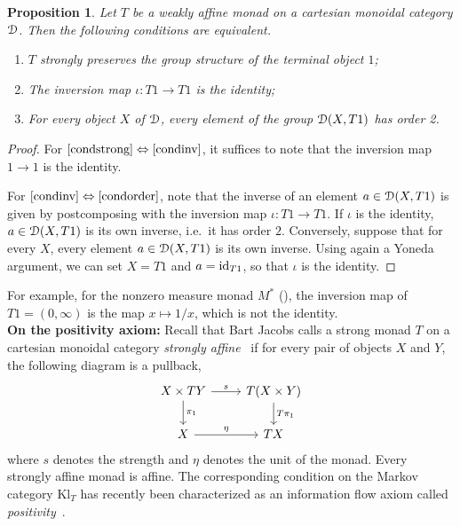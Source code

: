 \documentclass[a4paper,UKenglish,numberwithinsect,cleveref, autoref, thm-restate]{lipics-v2021}
\theoremstyle{plain} %
\newtheorem{myproposition}[mytheorem]{Proposition}
\theoremstyle{definition} %
\begin{document}
\begin{myproposition}
 Let $T$ be a weakly affine monad on a cartesian monoidal category $\mathcal{D}$. Then the following conditions are equivalent.
 \begin{enumerate}
  \item\label{condstrong} $T$ strongly preserves the group structure of the terminal object $1$;
  \item\label{condinv} The inversion map $\iota:T1\to T1$ is the identity;
  \item\label{condorder} For every object $X$ of $\mathcal{D}$, every element of the group $\mathcal{D}(X,T1)$ has order 2. 
 \end{enumerate}
\end{myproposition}
\begin{proof}
 For $\ref{condstrong}\Leftrightarrow\ref{condinv}$, it suffices to note that the inversion map $1\to 1$ is the identity. 
 
 For $\ref{condinv}\Leftrightarrow\ref{condorder}$, note that the inverse of an element $a\in\mathcal{D}(X,T1)$ is given by postcomposing with the inversion map $\iota:T1\to T1$. If $\iota$ is the identity, $a\in\mathcal{D}(X,T1)$ is its own inverse, i.e.~it has order $2$. Conversely, suppose that for every $X$, every element $a\in\mathcal{D}(X,T1)$ is its own inverse. Using again a Yoneda argument, we can set $X=T1$ and $a=\operatorname{ id}_{T1}$, so that $\iota$ is the identity.  
\end{proof}

For example, for the nonzero measure monad $M^*$ (), the inversion map of $T1=(0,\infty)$ is the map $x\mapsto 1/x$, which is not the identity. 
\\

\textbf{On the positivity axiom:}
Recall that Bart Jacobs calls a strong monad $T$ on a cartesian monoidal category \emph{strongly affine}~\cite{Jacobs16} if for every pair of objects $X$ and $Y$, the following diagram is a pullback,
 \[
  \begin{tikzcd}
   X \times TY \ar{d}{\pi_1} \ar{r}{s} & T(X\times Y) \ar{d}{T\pi_1} \\
   X \ar{r}{\eta} & TX
  \end{tikzcd}
 \]
where $s$ denotes the strength and $\eta$ denotes the unit of the monad. Every strongly affine monad is affine. 
The corresponding condition on the Markov category $\mathrm{Kl}_T$ has recently been characterized as an information flow axiom called \emph{positivity}~\cite[Section~2]{fritz2022dilations}.
\end{document}
